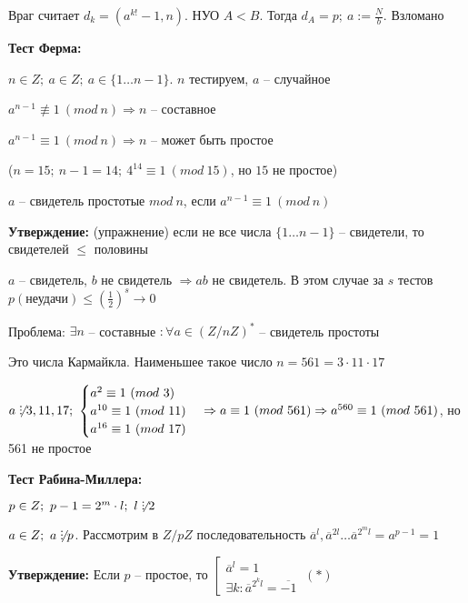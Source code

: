 \documentclass[14pt, letter paper]{article}
\def\divby{%
  \mathrel{\text{\vbox{\baselineskip.65ex\lineskiplimit0pt\hbox{.}\hbox{.}\hbox{.}}}}%
}
\begin{document}
\vspace{1mm}

Враг считает $d_k = (a^{k!} - 1, n)$. НУО $A < B$. Тогда $d_A = p;\ a := \frac{N}{b}$. Взломано

\vspace{5mm}

\textbf{Тест Ферма:}

$n \in Z;\ a \in Z;\ a \in \{1 \ldots n-1\}$. $n$ тестируем, $a$ -- случайное

$a^{n-1} \not\equiv 1\ (mod\ n) \Rightarrow n$ -- составное

$a^{n-1} \equiv 1\ (mod\ n) \Rightarrow n$ -- может быть простое

\vspace{2mm}

($n = 15;\ n-1 = 14;\ 4^{14} \equiv 1\ (mod\ 15)$, но $15$ не простое)

\vspace{2mm}

$a$ -- свидетель простотые $mod\ n$, если $a^{n-1} \equiv 1\ (mod\ n)$

\textbf{Утверждение:} (упражнение) если не все числа $\{1 \ldots n-1\}$ -- свидетели, то свидетелей $\leq$ половины

$a$ -- свидетель, $b$ не свидетель $\Rightarrow ab$ не свидетель. В этом случае за $s$ тестов $p(\text{неудачи}) \leq (\frac{1}{2})^s \rightarrow 0$

Проблема: $\exists n$ -- составные $: \forall a \in (Z/nZ)^*$ -- свидетель простоты

Это числа Кармайкла. Наименьшее такое число $n = 561 = 3 \cdot 11 \cdot 17$

$a \not\divby 3, 11, 17;\ \begin{cases}
    a^2 \equiv 1\ (mod\ 3) \\
    a^{10} \equiv 1\ (mod\ 11) \\
    a^{16} \equiv 1\ (mod\ 17)
\end{cases} \Rightarrow a \equiv 1\ (mod\ 561) \Rightarrow a^{560} \equiv 1\ (mod\ 561)$, но 561 не простое

\vspace{5mm}

\textbf{Тест Рабина-Миллера:}

$p \in Z;\ p - 1 = 2^m \cdot l;\ l \not\divby 2$

$a \in Z;\ a \not\divby p$. Рассмотрим в $Z/pZ$ последовательность $\overline{a}^l, \overline{a}^{2l} \ldots \overline{a}^{2^ml} = a^{p-1} = 1$

\textbf{Утверждение:} Если $p$ -- простое, то $\left[ \begin{gathered}
    \overline{a}^l = 1 \\
    \exists k : \overline{a}^{2^kl} = \overline{-1}
\end{gathered} \right.\ (*)$
\end{document}
